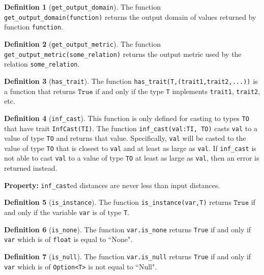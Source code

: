 \documentclass[11pt,a4paper]{article}
\theoremstyle{definition}
\newtheorem{definition}{Definition}[section]
\newcommand{\True}{\texttt{True}}
\newcommand{\iffText}{\text{if and only if}}
\begin{document}
\begin{definition}[\texttt{get\_output\_domain}]
    The function \texttt{get\_output\_domain(function)} returns the output domain of values returned by function \texttt{function}.
\end{definition}

\begin{definition}[\texttt{get\_output\_metric}]
    The function \texttt{get\_output\_metric(some\_relation)} returns the output metric used by the relation \texttt{some\_relation}.
\end{definition}

\begin{definition}[\texttt{has\_trait}]
    The function \texttt{has\_trait(T,(trait1,trait2,...))} is a function that returns $\True$ $\iffText$ the type \texttt{T} implements \texttt{trait1}, \texttt{trait2}, etc.
\end{definition}

\begin{definition}[\texttt{inf\_cast}]
    This function is only defined for casting to types \texttt{TO} that have trait \texttt{InfCast(TI)}. The function \texttt{inf\_cast(val:TI, TO)} casts \texttt{val} to a value of type \texttt{TO} and returns that value. Specifically, \texttt{val} will be casted to the value of type \texttt{TO} that is closest to \texttt{val} and at least as large as \texttt{val}. If \texttt{inf\_cast} is not able to cast \texttt{val} to a value of type \texttt{TO} at least as large as \texttt{val}, then an error is returned instead.
    
    \textbf{Property:} \texttt{inf\_cast}ed distances are never less than input distances.
\end{definition}

\begin{definition}[\texttt{is\_instance}]
    The function \texttt{is\_instance(var,T)} returns $\True$ if and only if the variable \texttt{var} is of type \texttt{T}.
\end{definition}



\begin{definition}[\texttt{is\_none}]
    The function \texttt{var.is\_none} returns \texttt{True} if and only if \texttt{var} which is of \texttt{float} is equal to ``None".
\end{definition}

\begin{definition}[\texttt{is\_null}]
    The function \texttt{var.is\_null} returns \texttt{True} if and only if \texttt{var} which is of \texttt{Option<T>} is not equal to ``Null".
\end{definition}
\end{document}
